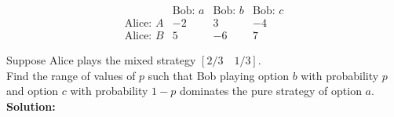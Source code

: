 \documentclass{article}
\begin{document}
$$\begin{array}{c|ccc}
& \text{Bob: } a & \text{Bob: } b & \text{Bob: } c \\
\hline
\text{Alice: } A & -2 & 3 & -4 \\
\text{Alice: } B & 5 & -6 & 7
\end{array}$$

Suppose Alice plays the mixed strategy $\left[2/3 \quad 1/3\right]$. \\

Find the range of values of $p$ such that Bob playing option $b$ with probability $p$ and option $c$ with probability $1 - p$ dominates the pure strategy of option $a$. \\

\textbf{Solution: } \\
\end{document}
